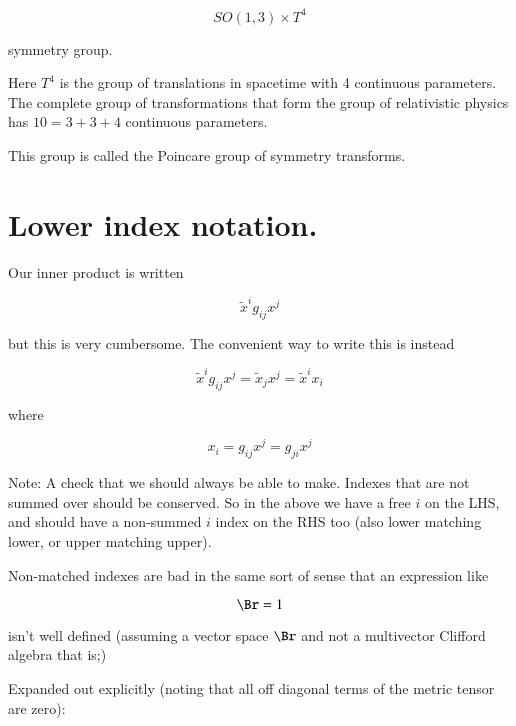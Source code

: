 \begin{equation*}
SO(1,3) \times T^4
\end{equation*}

symmetry group.

Here $T^4$ is the group of translations in spacetime with 4 continuous parameters.   The complete group of transformations that form the group of relativistic physics has $10 = 3 + 3 + 4$ continuous parameters.

This group is called the Poincare group of symmetry transforms.

\section{Lower index notation.}

Our inner product is written

\begin{equation}\label{eqn:relativisticElectrodynamicsL6:150}
\tilde{x}^i g_{ij} x^j
\end{equation}

but this is very cumbersome.  The convenient way to write this is instead

\begin{equation}\label{eqn:relativisticElectrodynamicsL6:160}
\tilde{x}^i g_{ij} x^j = \tilde{x}_j x^j = \tilde{x}^i x_i
\end{equation}

where 

\begin{equation}\label{eqn:relativisticElectrodynamicsL6:170}
x_i = g_{ij} x^j = g_{ji} x^j
\end{equation}

Note: A check that we should always be able to make.  Indexes that are not summed over should be conserved.  So in the above we have a free $i$ on the LHS, and should have a non-summed $i$ index on the RHS too (also lower matching lower, or upper matching upper).

Non-matched indexes are bad in the same sort of sense that an expression like

\begin{equation}\label{eqn:relativisticElectrodynamicsL6:180}
\Br = 1
\end{equation}

isn't well defined (assuming a vector space $\Br$ and not a multivector Clifford algebra that is;)

Expanded out explicitly (noting that all off diagonal terms of the metric tensor are zero):

